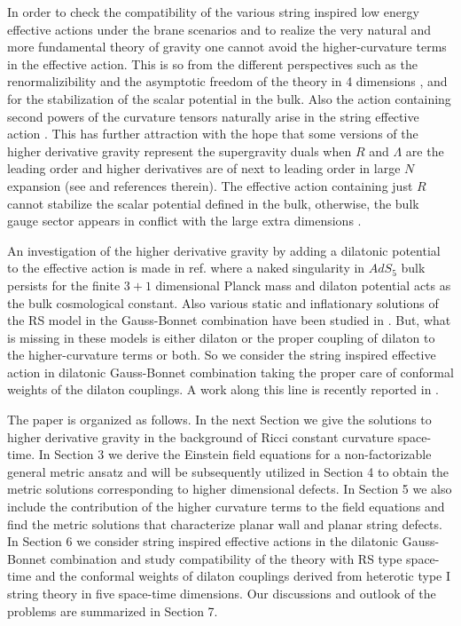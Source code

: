 \documentclass[a4paper,12pt]{article}
\begin{document}
In order to check the compatibility of the various string inspired low 
energy effective actions under the brane scenarios and to realize the very 
natural and more fundamental theory of gravity one cannot avoid the 
higher-curvature terms in the effective action. This is so from the 
different perspectives such as the renormalizibility and the asymptotic 
freedom of the theory in 4 dimensions \cite{KKS}, and for the stabilization 
of the scalar potential \cite{CWE} in the bulk. Also the action 
containing second powers of the curvature tensors naturally arise in the 
string effective action \cite{GSW}. This has further attraction with the 
hope that some versions of the higher derivative gravity represent the 
supergravity duals when $R$ and $\Lambda$ are the leading order and higher 
derivatives are of next to leading order in large $N$ expansion 
(see \cite{NOJ} and references therein). The effective action containing 
just $R$ cannot stabilize the scalar potential defined in the bulk, 
otherwise, the bulk gauge sector appears in conflict with the large extra 
dimensions \cite{CWE,NAH}.

An investigation of the higher derivative gravity by adding a dilatonic 
potential to the effective action is made in ref.\cite{ILZ} where a naked 
singularity in $AdS_5$ bulk persists for the finite $3+1$ dimensional Planck 
mass and dilaton potential acts as the bulk cosmological constant. Also 
various static and inflationary solutions of the RS model in the Gauss-Bonnet 
combination have been studied in \cite{KKL}. But, what is missing in these 
models is either dilaton or the proper coupling of dilaton to the 
higher-curvature terms or both. So we consider the string inspired effective 
action \cite{AAT,ESF} in dilatonic Gauss-Bonnet combination taking the 
proper care of conformal weights of the dilaton couplings. A work along 
this line is recently reported in \cite{NIC}. 

The paper is organized as follows. In the next Section we give the 
solutions to higher derivative gravity in the background of Ricci constant 
curvature space-time. In Section 3 we derive the Einstein field equations 
for a non-factorizable general metric ansatz and will be subsequently 
utilized in Section 4 to obtain the metric solutions corresponding to higher 
dimensional defects. In Section 5 we also include the contribution of the 
higher curvature terms to the field equations and find the metric solutions 
that characterize planar wall and planar string defects. 
In Section 6 we consider string inspired effective actions in the dilatonic 
Gauss-Bonnet combination and study compatibility of the theory with 
RS type space-time and the conformal weights of dilaton couplings derived  
from heterotic type I string theory in five space-time dimensions. 
Our discussions and outlook of the problems are summarized in Section 7.
\end{document}
